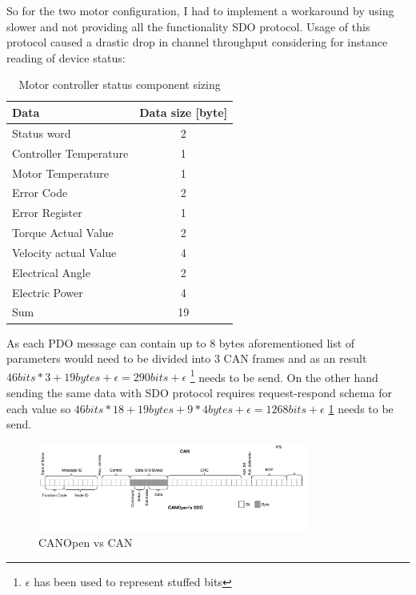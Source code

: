 So for the two motor configuration, I had to implement a workaround by using slower and not providing all the functionality SDO protocol.
Usage of this protocol caused a drastic drop in channel throughput considering for instance reading of device status:
\begin{table}[H]
\centering
\begin{tabular}{|l|c|}
    \hline
    Data & Data size [byte] \\
    \hline
    Status word & 2 \\
    Controller Temperature & 1 \\
    Motor Temperature & 1 \\
    Error Code & 2  \\
    Error Register & 1 \\
    Torque Actual Value & 2  \\
    Velocity actual Value & 4  \\
    Electrical Angle & 2  \\
    Electric Power & 4 \\
    \hline
    \hfill Sum & 19 \\
    \hline
\end{tabular}
\caption{Motor controller status component sizing}
\end{table}

As each PDO message can contain up to 8 bytes aforementioned list of parameters would need to be divided into 3 CAN frames and as an result $46bits*3+19bytes+\epsilon = 290 bits +\epsilon$  \hspace{0.2cm}\footnote{\label{foot:eps}$\epsilon$ has been used to represent stuffed bits} needs to be send. On the other hand sending the same data with SDO protocol requires request-respond schema for each value so $46bits*18 + 19bytes + 9*4bytes + \epsilon = 1268 bits + \epsilon$ \hspace{0.2cm} \ref{foot:eps} needs to be send.

\begin{figure}[H]
    \centering
    \includegraphics[width=0.8\textwidth]{figures/CANOpen_vs_CAN}
    \caption{CANOpen vs CAN}
    \label{fig:canopen_bitwise}
\end{figure}

